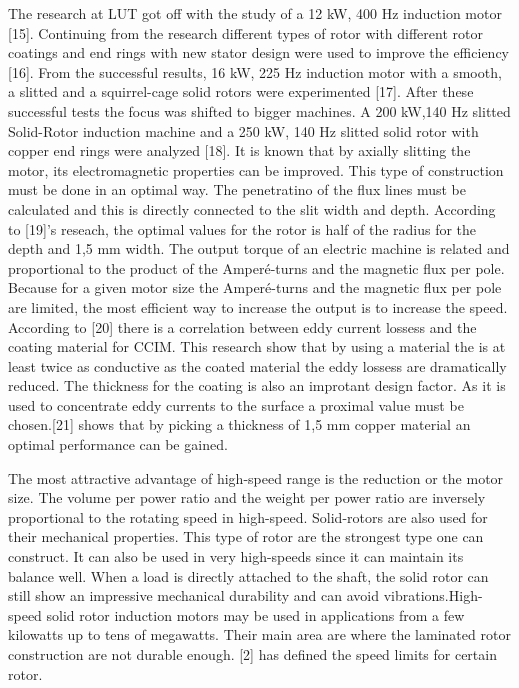   

The research at LUT got off with the study of a 12 kW, 400 Hz induction
motor [15]. Continuing from the research different types of rotor with different rotor
coatings and end rings with new stator design were used to improve the efficiency
[16]. From the successful results, 16 kW, 225 Hz induction motor with a smooth, a
slitted and a squirrel-cage solid rotors were experimented [17].
After these successful tests the focus was shifted to bigger machines. A 200
kW,140 Hz slitted Solid-Rotor induction machine and a 250 kW, 140 Hz slitted solid
rotor with copper end rings were analyzed [18].
It is known that by axially slitting the motor, its electromagnetic properties
can be improved. This type of construction must be done in an optimal way. The
penetratino of the flux lines must be calculated and this is directly connected to the
slit width and depth. According to [19]'s reseach, the optimal values for the rotor is
half of the radius for the depth and 1,5 mm width.
The output torque of an electric machine is related and proportional to the
product of the Amperé-turns and the magnetic flux per pole. Because for a given
motor size the Amperé-turns and the magnetic flux per pole are limited, the most
efficient way to increase the output is to increase the speed.
According to [20] there is a correlation between eddy current lossess and the
coating material for CCIM. This research show that by using a material the is at least
twice as conductive as the coated material the eddy lossess are dramatically reduced.
The thickness for the coating is also an improtant design factor. As it is used to
concentrate eddy currents to the surface a proximal value must be chosen.[21] shows
that by picking a thickness of 1,5 mm copper material an optimal performance can be
gained.


The most attractive advantage of high-speed range is the reduction or the
motor size. The volume per power ratio and the weight per power ratio are inversely
proportional to the rotating speed in high-speed.
Solid-rotors are also used for their mechanical properties. This type of rotor
are the strongest type one can construct. It can also be used in very high-speeds since
it can maintain its balance well. When a load is directly attached to the shaft, the
solid rotor can still show an impressive mechanical durability and can avoid
vibrations.High-speed solid rotor induction motors may be used in applications from
a few kilowatts up to tens of megawatts. Their main area are where the laminated
rotor construction are not durable enough. [2] has defined the speed limits for certain
rotor.

